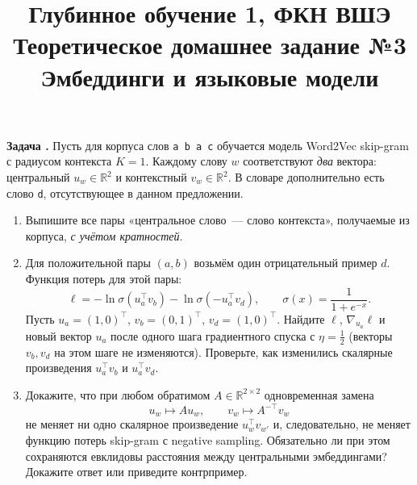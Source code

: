 \documentclass[12pt,letterpaper]{article}
\title{Глубинное обучение 1, ФКН ВШЭ\\
Теоретическое домашнее задание №3\\
Эмбеддинги и языковые модели}
\author{}
\date{}
\newcounter{task}
\newcommand{\task}{\par\addvspace{0.8\baselineskip}%
  \refstepcounter{task}\noindent\textbf{Задача \thetask.}\enspace}
\begin{document}
\maketitle

\task
Пусть для корпуса слов \texttt{a b a c} обучается модель Word2Vec
skip-gram с радиусом контекста $K=1$. Каждому слову $w$ соответствуют
\emph{два} вектора: центральный $u_w\in\mathbb{R}^2$ и контекстный
$v_w\in\mathbb{R}^2$. В словаре дополнительно есть слово \texttt{d},
отсутствующее в данном предложении.
\begin{enumerate}
  \item Выпишите все пары «центральное слово~--- слово контекста»,
  получаемые из корпуса, \emph{с учётом кратностей}.

  \item Для положительной пары $(a,b)$ возьмём один отрицательный
  пример $d$. Функция потерь для этой пары:
  \[
    \ell=-\ln\sigma(u_a^\top v_b)-\ln\sigma(-u_a^\top v_d),
    \qquad \sigma(x)=\frac{1}{1+e^{-x}}.
  \]
  Пусть $u_a=(1,0)^\top$, $v_b=(0,1)^\top$, $v_d=(1,0)^\top$.
  Найдите $\ell$, $\nabla_{u_a}\ell$ и новый вектор $u_a$ после одного
  шага градиентного спуска с $\eta=\tfrac12$ (векторы $v_b,v_d$
  на этом шаге не изменяются). Проверьте, как изменились скалярные
  произведения $u_a^\top v_b$ и $u_a^\top v_d$.

  \item Докажите, что при любом обратимом $A\in\mathbb{R}^{2\times2}$
  одновременная замена
  \[
    u_w\longmapsto Au_w,\qquad v_w\longmapsto A^{-\top}v_w
  \]
  не меняет ни одно скалярное произведение $u_w^\top v_{w'}$ и,
  следовательно, не меняет функцию потерь skip-gram с negative sampling.
  Обязательно ли при этом сохраняются евклидовы расстояния между
  центральными эмбеддингами? Докажите ответ или приведите контрпример.
\end{enumerate}
\end{document}
